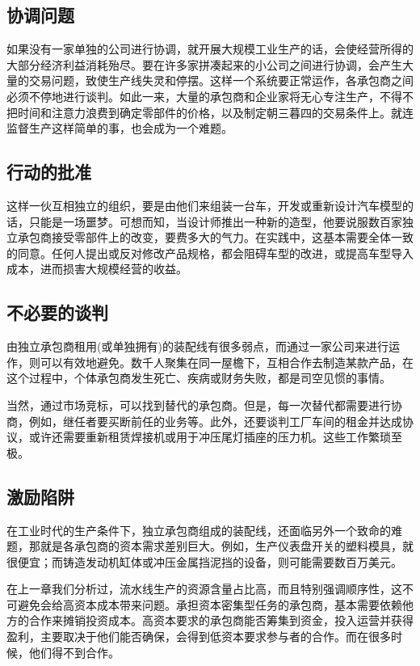 \subsection{协调问题}
如果没有一家单独的公司进行协调，就开展大规模工业生产的话，会使经营所得的大部分经济利益消耗殆尽。要在许多家拼凑起来的小公司之间进行协调，会产生大量的交易问题，致使生产线失灵和停摆。这样一个系统要正常运作，各承包商之间必须不停地进行谈判。如此一来，大量的承包商和企业家将无心专注生产，不得不把时间和注意力浪费到确定零部件的价格，以及制定朝三暮四的交易条件上。就连监督生产这样简单的事，也会成为一个难题。

\subsection{行动的批准}
这样一伙互相独立的组织，要是由他们来组装一台车，开发或重新设计汽车模型的话，只能是一场噩梦。可想而知，当设计师推出一种新的造型，他要说服数百家独立承包商接受零部件上的改变，要费多大的气力。在实践中，这基本需要全体一致的同意。任何人提出或反对修改产品规格，都会阻碍车型的改进，或提高车型导入成本，进而损害大规模经营的收益。

\subsection{不必要的谈判}
由独立承包商租用(或单独拥有)的装配线有很多弱点，而通过一家公司来进行运作，则可以有效地避免。数千人聚集在同一屋檐下，互相合作去制造某款产品，在这个过程中，个体承包商发生死亡、疾病或财务失败，都是司空见惯的事情。

当然，通过市场竞标，可以找到替代的承包商。但是，每一次替代都需要进行协商，例如，继任者要买断前任的业务等。此外，还要谈判工厂车间的租金并达成协议，或许还需要重新租赁焊接机或用于冲压尾灯插座的压力机。这些工作繁琐至极。

\subsection{激励陷阱}
在工业时代的生产条件下，独立承包商组成的装配线，还面临另外一个致命的难题，那就是各承包商的资本需求差别巨大。例如，生产仪表盘开关的塑料模具，就很便宜；而铸造发动机缸体或冲压金属挡泥挡的设备，则可能需要数百万美元。

在上一章我们分析过，流水线生产的资源含量占比高，而且特别强调顺序性，这不可避免会给高资本成本带来问题。承担资本密集型任务的承包商，基本需要依赖他方的合作来摊销投资成本。高资本要求的承包商能否筹集到资金，投入运营并获得盈利，主要取决于他们能否确保，会得到低资本要求参与者的合作。而在很多时候，他们得不到合作。


